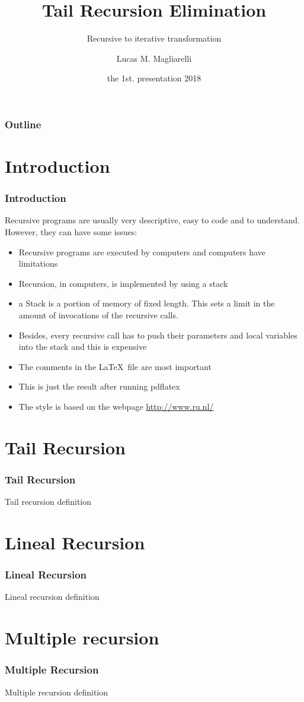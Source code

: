 \documentclass{beamer}
\title[Tail Recursion Elimination]{Tail Recursion Elimination}
\subtitle{Recursive to iterative transformation}
\author[Lucas M. Magliarelli]{
	Lucas M. Magliarelli 
}
\institute[TradeHelm Inc.]{
	TradeHelm Inc.
}
\date[March, 2018]{
	the 1st. presentation 2018
}
\begin{document}
\begin{frame}
	\titlepage
\end{frame}
\begin{frame}
	\frametitle{Outline}
	\tableofcontents
\end{frame}
\section{Introduction}
\begin{frame}
	\frametitle{Introduction}
	Recursive programs are usually very descriptive, easy to code and to understand. However, they can have some issues:
	\begin{itemize}
		\item Recursive programs are executed by computers and computers have limitations
		\item Recursion, in computers, is implemented by using a stack
		\item a Stack is a portion of memory of fixed length. This sets a limit in the amount of invocations of the recursive calls.
		\item Besides, every recursive call has to push their parameters and local variables into the stack and this is expensive
		\item The comments in the  \LaTeX\ file are most important
		\item This is just the result after running pdflatex
		\item The style is based on the webpage \url{http://www.ru.nl/}
	\end{itemize}
\end{frame}
\section{Tail Recursion}
\begin{frame}
	\frametitle{Tail Recursion}
	Tail recursion definition
\end{frame}
\section{Lineal Recursion}
\begin{frame}
	\frametitle{Lineal Recursion}
	Lineal recursion definition
\end{frame}
\section{Multiple recursion}
\begin{frame}
	\frametitle{Multiple Recursion}
	Multiple recursion definition
\end{frame}
\end{document}
